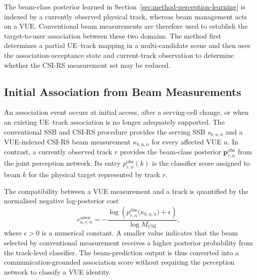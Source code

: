 The beam-class posterior learned in
Section~\ref{sec:method-perception-learning} is indexed by a currently observed
physical track, whereas beam management acts on a VUE.  Conventional beam
measurements are therefore used to establish the target-to-user association
between these two domains.  The method first determines a partial UE--track
mapping in a multi-candidate scene and then uses the association-acceptance state
and current-track observation to determine whether the CSI-RS measurement set
may be reduced.

\subsection{Initial Association from Beam Measurements}
\label{subsec:method-beam-measurement-association}

An association event occurs at initial access, after a serving-cell change, or
when an existing UE--track association is no longer adequately supported.  The
conventional SSB and CSI-RS procedure provides the serving SSB \(s_{b,u,n}\) and
a VUE-indexed CSI-RS beam measurement \(\kappa_{b,u,n}\) for every affected VUE
\(u\).  In contrast, a currently observed track \(r\) provides the beam-class
posterior \(\mathbf{p}^{\mathrm{obs}}_{r,n}\) from the joint perception network.
Its entry \(p^{\mathrm{obs}}_{r,n}(k)\) is the classifier score assigned to beam
\(k\) for the physical target represented by track \(r\).

The compatibility between a VUE measurement and a track is quantified by the
normalised negative log-posterior cost
\begin{equation}
    c^{\mathrm{assoc}}_{u,r,n}
    =
    -\frac{\log\!\left(p^{\mathrm{obs}}_{r,n}\bigl(\kappa_{b,u,n}\bigr)+\epsilon\right)}{\log M_{\mathrm{CSI}}},
    \label{eq:method-association-cost}
\end{equation}
where \(\epsilon>0\) is a numerical constant.  A smaller value indicates that
the beam selected by conventional measurement receives a higher posterior
probability from the track-level classifier.  The beam-prediction output is thus
converted into a communication-grounded association score without requiring the
perception network to classify a VUE identity.

